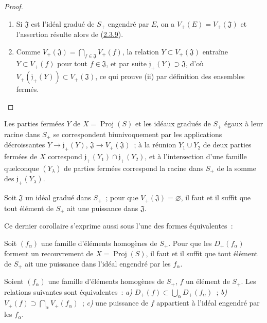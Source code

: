 \begin{proof}
\begin{enumerate}
  \item[\rm(i)] Si $\mathfrak{J}$ est l'idéal gradué de $S_+$ engendré
    par $E$, on a $V_+(E)=V_+(\mathfrak{J})$ et l'assertion résulte alors de
    (\hyperref[II.2.3.9-fr]{2.3.9}).
  \item[\rm(ii)] Comme
    $V_+(\mathfrak{J})=\bigcap_{f\in\mathfrak{J}}V_+(f)$, la relation
    $Y\subset V_+(\mathfrak{J})$ entraîne $Y\subset V_+(f)$ pour tout
    $f\in\mathfrak{J}$, et par suite
    $\mathfrak{j}_+(Y)\supset\mathfrak{J}$, d'où
    $V_+(\mathfrak{j}_+(Y))\subset V_+(\mathfrak{J})$, ce qui prouve (ii)
    par définition des ensembles fermés.
\end{enumerate}
\end{proof}

\begin{corollary}[2.3.12]
\label{II.2.3.12-fr}
Les parties fermées $Y$ de $X=\operatorname{Proj}(S)$ et les idéaux gradués
de $S_+$ égaux à leur racine dans $S_+$ se correspondent biunivoquement par
les applications décroissantes
$Y\to\mathfrak{j}_+(Y)$, $\mathfrak{J}\to
V_+(\mathfrak{J})$~; à la réunion $Y_1\cup Y_2$ de deux parties fermées de
$X$ correspond
$\mathfrak{j}_+(Y_1)\cap\mathfrak{j}_+(Y_2)$, et à l'intersection d'une
famille quelconque $(Y_\lambda)$ de parties fermées correspond la racine
dans $S_+$ de la somme des $\mathfrak{j}_+(Y_\lambda)$.
\end{corollary}

\begin{corollary}[2.3.13]
\label{II.2.3.13-fr}
Soit $\mathfrak{J}$ un idéal gradué dans $S_+$~; pour que
$V_+(\mathfrak{J})=\varnothing$, il faut et il suffit que tout élément de
$S_+$ ait une puissance dans $\mathfrak{J}$.
\end{corollary}

Ce dernier corollaire s'exprime aussi sous l'une des formes équivalentes~:

\begin{corollary}[2.3.14]
\label{II.2.3.14-fr}
Soit $(f_\alpha)$ une famille d'éléments homogènes de $S_+$. Pour que les
$D_+(f_\alpha)$ forment un recouvrement de
$X=\operatorname{Proj}(S)$, il faut et il suffit que tout élément de $S_+$
ait une puissance dans l'idéal engendré par les $f_\alpha$.
\end{corollary}

\begin{corollary}[2.3.15]
\label{II.2.3.15-fr}
Soient $(f_\alpha)$ une famille d'éléments homogènes de $S_+$, $f$ un
élément de $S_+$. Les relations suivantes sont équivalentes~:
\textit{a)} $D_+(f)\subset\bigcup_\alpha D_+(f_\alpha)$~;
\textit{b)} $V_+(f)\supset\bigcap_\alpha V_+(f_\alpha)$~;
\textit{c)} une puissance de $f$ appartient à l'idéal engendré par les
$f_\alpha$.
\end{corollary}

